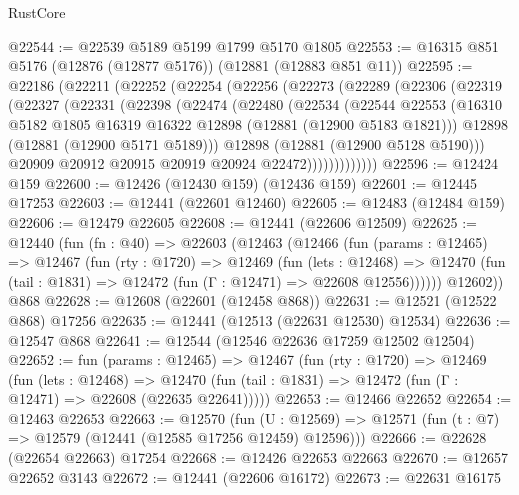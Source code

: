 \begin{lexlean}{RustCore}
\begin{coremodule}
@22544 := @22539 @5189 @5199 @1799 @5170 @1805
@22553 := @16315 @851 @5176 (@12876 (@12877 @5176)) (@12881 (@12883 @851 @11))
@22595 := @22186
    (@22211
      (@22252
        (@22254
          (@22256
            (@22273
              (@22289
                (@22306
                  (@22319
                    (@22327
                      (@22331
                        (@22398
                          (@22474
                            (@22480
                              (@22534
                                (@22544
                                  @22553
                                  (@16310
                                    @5182
                                    @1805
                                    @16319
                                    @16322
                                    @12898
                                    (@12881 (@12900 @5183 @1821)))
                                  @12898
                                  (@12881 (@12900 @5171 @5189)))
                                @12898
                                (@12881 (@12900 @5128 @5190)))
                              @20909
                              @20912
                              @20915
                              @20919
                              @20924
                              @22472)))))))))))))
@22596 := @12424 @159
@22600 := @12426 (@12430 @159) (@12436 @159)
@22601 := @12445 @17253
@22603 := @12441 (@22601 @12460)
@22605 := @12483 (@12484 @159)
@22606 := @12479 @22605
@22608 := @12441 (@22606 @12509)
@22625 := @12440
    (fun (fn : @40) =>
    @22603
      (@12463
        (@12466
          (fun (params : @12465) =>
          @12467
            (fun (rty : @1720) =>
            @12469
              (fun (lets : @12468) =>
              @12470 (fun (tail : @1831) => @12472 (fun (Γ : @12471) => @22608 @12556))))))
        @12602))
    @868
@22628 := @12608 (@22601 (@12458 @868))
@22631 := @12521 (@12522 @868) @17256
@22635 := @12441 (@12513 (@22631 @12530) @12534)
@22636 := @12547 @868
@22641 := @12544 (@12546 @22636 @17259 @12502 @12504)
@22652 := fun (params : @12465) =>
  @12467
    (fun (rty : @1720) =>
    @12469
      (fun (lets : @12468) =>
      @12470 (fun (tail : @1831) => @12472 (fun (Γ : @12471) => @22608 (@22635 @22641)))))
@22653 := @12466 @22652
@22654 := @12463 @22653
@22663 := @12570
    (fun (U : @12569) => @12571 (fun (t : @7) => @12579 (@12441 (@12585 @17256 @12459) @12596)))
@22666 := @22628 (@22654 @22663) @17254
@22668 := @12426 @22653 @22663
@22670 := @12657 @22652 @3143
@22672 := @12441 (@22606 @16172)
@22673 := @22631 @16175

\end{coremodule}
\end{lexlean}
